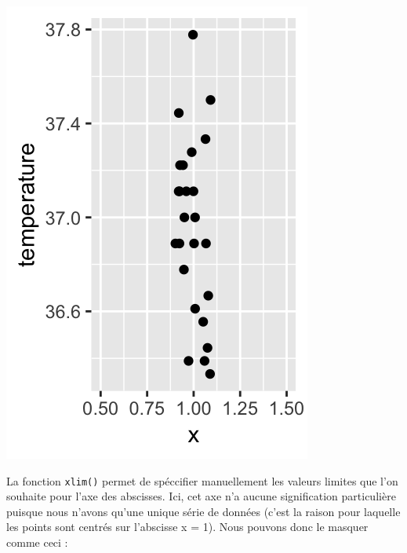 \documentclass[a4paperpaper,]{article}
\newenvironment{Shaded}{\begin{snugshade}}{\end{snugshade}}
\newcommand{\DataTypeTok}[1]{\textcolor[rgb]{0.00,0.34,0.68}{#1}}
\newcommand{\DecValTok}[1]{\textcolor[rgb]{0.69,0.50,0.00}{#1}}
\newcommand{\FloatTok}[1]{\textcolor[rgb]{0.69,0.50,0.00}{#1}}
\newcommand{\KeywordTok}[1]{\textcolor[rgb]{0.12,0.11,0.11}{\textbf{#1}}}
\newcommand{\NormalTok}[1]{\textcolor[rgb]{0.12,0.11,0.11}{#1}}
\newcommand{\OperatorTok}[1]{\textcolor[rgb]{0.12,0.11,0.11}{#1}}
\newcommand{\StringTok}[1]{\textcolor[rgb]{0.75,0.01,0.01}{#1}}
\begin{document}
\begin{Shaded}
\end{Shaded}

\begin{center}\includegraphics[width=0.25\linewidth]{figure/unnamed-chunk-16-1} \end{center}

La fonction \texttt{xlim()} permet de spéccifier manuellement les valeurs limites que l'on souhaite pour l'axe des abscisses. Ici, cet axe n'a aucune signification particulière puisque nous n'avons qu'une unique série de données (c'est la raison pour laquelle les points sont centrés sur l'abscisse x = 1). Nous pouvons donc le masquer comme ceci :

\begin{Shaded}
\end{Shaded}
\end{document}
